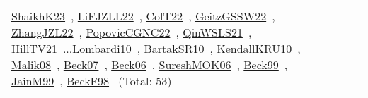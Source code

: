 {\begin{longtable}{p{3cm}r>{\raggedright\arraybackslash}p{6cm}>{\raggedright\arraybackslash}p{6cm}>{\raggedright\arraybackslash}p{8cm}}
\href{../works/ShaikhK23.pdf}{ShaikhK23}~\cite{ShaikhK23}, \href{../works/LiFJZLL22.pdf}{LiFJZLL22}~\cite{LiFJZLL22}, \href{../works/ColT22.pdf}{ColT22}~\cite{ColT22}, \href{../works/GeitzGSSW22.pdf}{GeitzGSSW22}~\cite{GeitzGSSW22}, \href{../works/ZhangJZL22.pdf}{ZhangJZL22}~\cite{ZhangJZL22}, \href{../works/PopovicCGNC22.pdf}{PopovicCGNC22}~\cite{PopovicCGNC22}, \href{../works/QinWSLS21.pdf}{QinWSLS21}~\cite{QinWSLS21}, \href{../works/HillTV21.pdf}{HillTV21}~\cite{HillTV21}...\href{../works/Lombardi10.pdf}{Lombardi10}~\cite{Lombardi10}, \href{../works/BartakSR10.pdf}{BartakSR10}~\cite{BartakSR10}, \href{../works/KendallKRU10.pdf}{KendallKRU10}~\cite{KendallKRU10}, \href{../works/Malik08.pdf}{Malik08}~\cite{Malik08}, \href{../works/Beck07.pdf}{Beck07}~\cite{Beck07}, \href{../works/Beck06.pdf}{Beck06}~\cite{Beck06}, \href{../works/SureshMOK06.pdf}{SureshMOK06}~\cite{SureshMOK06}, \href{../works/Beck99.pdf}{Beck99}~\cite{Beck99}, \href{../works/JainM99.pdf}{JainM99}~\cite{JainM99}, \href{../works/BeckF98.pdf}{BeckF98}~\cite{BeckF98} (Total: 53)\\

\end{longtable}}
